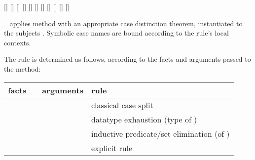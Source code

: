 \begin{isabellebody}
\begin{isamarkuptext}
\begin{railoutput}
[]
[]
[]
\rail@endbar
\rail@end
{}
\rail@plus
{}
[]
\rail@endplus
\rail@end
{}
[]
[]
\rail@plus
\rail@plus
{}
[]
\rail@endplus
{}[]
\rail@endplus
\rail@end
{}
[]
[]
[]
\rail@end
\end{railoutput}


  \begin{description}

  \item \hyperlink{method.cases}{\mbox{}}~ applies method \hyperlink{method.rule}{\mbox{}} with an appropriate case distinction theorem, instantiated to
  the subjects .  Symbolic case names are bound according
  to the rule's local contexts.

  The rule is determined as follows, according to the facts and
  arguments passed to the \hyperlink{method.cases}{\mbox{}} method:

  \medskip
  \begin{tabular}{llll}
    facts           &                 & arguments   & rule \\\hline
                    & \hyperlink{method.cases}{\mbox{\isa{cases}}} &             & classical case split \\
                    & \hyperlink{method.cases}{\mbox{\isa{cases}}} & \isa{t}   & datatype exhaustion (type of \isa{t}) \\
    \isa{{\isaliteral{22}{\isachardoublequote}}{\isaliteral{5C3C7475726E7374696C653E}{\isasymturnstile}}\ A\ t{\isaliteral{22}{\isachardoublequote}}} & \hyperlink{method.cases}{\mbox{\isa{cases}}} & \isa{{\isaliteral{22}{\isachardoublequote}}{\isaliteral{5C3C646F74733E}{\isasymdots}}{\isaliteral{22}{\isachardoublequote}}} & inductive predicate/set elimination (of \isa{A}) \\
    \isa{{\isaliteral{22}{\isachardoublequote}}{\isaliteral{5C3C646F74733E}{\isasymdots}}{\isaliteral{22}{\isachardoublequote}}}     & \hyperlink{method.cases}{\mbox{\isa{cases}}} & \isa{{\isaliteral{22}{\isachardoublequote}}{\isaliteral{5C3C646F74733E}{\isasymdots}}\ rule{\isaliteral{3A}{\isacharcolon}}\ R{\isaliteral{22}{\isachardoublequote}}} & explicit rule \isa{R} \\
  \end{tabular}
  \medskip


\end{description}
\end{isamarkuptext}
\end{isabellebody}
